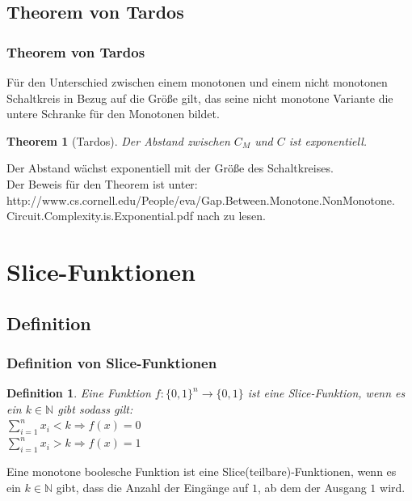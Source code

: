 \documentclass[hyperref={pdfpagelabels=false}]{beamer} %
\newtheorem{thm}{Theorem}
\newtheorem{defin}{Definition}
\begin{document}
  \subsection{Theorem von Tardos}
  \begin{frame}
    \frametitle{Theorem von Tardos}
    Für den Unterschied zwischen einem monotonen und einem nicht monotonen Schaltkreis in Bezug auf die Größe gilt, das seine nicht monotone Variante die untere Schranke für den Monotonen bildet.
    \begin{thm}[Tardos]
      Der Abstand zwischen $C_{M}$ und $C$ ist exponentiell. %
    \end{thm}
    Der Abstand w\"achst exponentiell mit der Gr\"o\ss{}e des Schaltkreises. \\
    Der Beweis f\"ur den Theorem ist unter:\\
    http://www.cs.cornell.edu/People/eva/Gap.Between.Monotone.NonMonotone.\\Circuit.Complexity.is.Exponential.pdf
    nach zu lesen.
  \end{frame}

  \section{Slice-Funktionen}
  \subsection*{Definition}
  \begin{frame}%
    \frametitle{Definition von Slice-Funktionen}
    \begin{defin}
      Eine Funktion $f:\{0,1\}^n \rightarrow \{0,1\}$ ist eine Slice-Funktion, wenn es ein $k \in \mathbb{N}$ gibt sodass gilt:\\
      $\sum_{i=1}^{n} x_i<k\Rightarrow f(x)=0$\\
      $\sum_{i=1}^{n} x_i>k\Rightarrow f(x)=1$\\
    \end{defin}
    Eine monotone boolesche Funktion ist eine Slice(teilbare)-Funktionen, wenn es
    ein $k \in \mathbb{N}$ gibt, dass die Anzahl der Eing\"ange auf $1$, ab dem der Ausgang $1$ wird.
  \end{frame}
\end{document}
